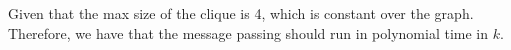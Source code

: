 Given that the max size of the clique is 4, which is constant over the graph. Therefore, we have that the message passing should run in polynomial time in $k$.